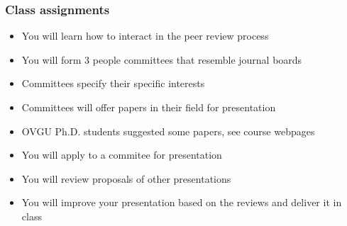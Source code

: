 \begin{frame}
\frametitle{Class assignments}
\begin{itemize}
\item You will learn how to interact in the peer review process
\item You will form 3 people committees that resemble journal boards
\item Committees specify their specific interests
\item Committees will offer papers in their field for presentation
\item OVGU Ph.D. students suggested some papers, see course webpages
\item You will apply to a commitee for presentation
\item You will review proposals of other presentations
\item You will improve your presentation based on the reviews and deliver it in class
\end{itemize}
\end{frame}
